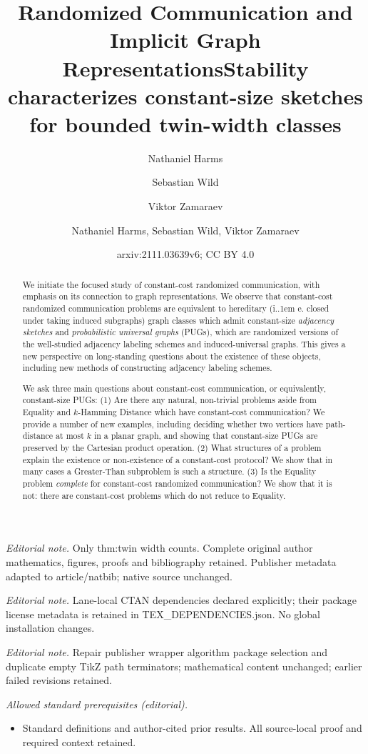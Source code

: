 \documentclass{article}
\title{Randomized Communication and Implicit Graph Representations}
\author{Nathaniel Harms \and Sebastian Wild \and Viktor Zamaraev}\date{}
\title{Stability characterizes constant-size sketches for bounded twin-width classes}
\author{Nathaniel Harms, Sebastian Wild, Viktor Zamaraev}
\date{arxiv:2111.03639v6; CC BY 4.0}
\makeatletter
\newcommand*\ie{i.\kern.1em e.\@\xspace} %
\makeatother
\begin{document}
\maketitle
\noindent\textit{Editorial note.} Only thm:twin width counts. Complete original author mathematics, figures, proofs and bibliography retained. Publisher metadata adapted to article/natbib; native source unchanged.\par\medskip
\noindent\textit{Editorial note.} Lane-local CTAN dependencies declared explicitly; their package license metadata is retained in TEX\_DEPENDENCIES.json. No global installation changes.\par\medskip
\noindent\textit{Editorial note.} Repair publisher wrapper algorithm package selection and duplicate empty TikZ path terminators; mathematical content unchanged; earlier failed revisions retained.\par\medskip
\noindent\textit{Allowed standard prerequisites (editorial).}\begin{itemize}
\item Standard definitions and author-cited prior results. All source-local proof and required context retained.
\end{itemize}\medskip

\maketitle

\begin{abstract}
We initiate the focused study of constant-cost randomized communication, with emphasis on its
connection to graph representations. We observe that constant-cost randomized communication
problems are equivalent to hereditary (\ie closed under taking induced subgraphs) graph classes
which admit constant-size \emph{adjacency sketches} and \emph{probabilistic universal graphs}
(PUGs), which are randomized versions of the well-studied adjacency labeling schemes and
induced-universal graphs.  This gives a new perspective on long-standing questions about the
existence of these objects, including new methods of constructing adjacency labeling schemes.

We ask three main questions about constant-cost communication, or equivalently, constant-size
PUGs: (1) Are there any natural, non-trivial problems aside from Equality
and $k$-Hamming Distance which have constant-cost communication? We provide a number of new
examples, including deciding whether two vertices have path-distance at most $k$ in a planar graph,
and showing that constant-size PUGs are preserved by the Cartesian product operation.  (2) What
structures of a problem explain the existence or non-existence of a constant-cost protocol?  
We show that in many cases a Greater-Than subproblem is such a structure.
(3) Is the Equality problem \emph{complete} for constant-cost randomized communication? We
show that it is not: there are constant-cost problems which do not reduce to Equality.
\end{abstract}
\end{document}
